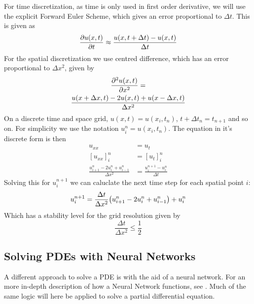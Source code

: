 For time discretization, as time is only used in first order derivative, we will use the explicit Forward Euler Scheme, which gives an error proportional to $\Delta t$. This is given as
\begin{equation}
    \pdv{u(x,t)}{t} \approx \frac{u(x,t+\Delta t) - u(x,t)}{\Delta t}
    \label{eq:FE}
\end{equation}
For the spatial discretization we use centred difference, which has an error proportional to $\Delta x^2$, given by
\begin{multline}
    \pdv[2]{u(x,t)}{x} = \\ \frac{u(x+\Delta x,t) - 2u(x,t) + u(x-\Delta x,t)}{\Delta x^2}
    \label{eq:CD}
\end{multline}
On a discrete time and space grid, $u(x,t) = u(x_i,t_n)$, $t+\Delta t_n = t_{n+1}$ and so on.
For simplicity we use the notation $u_i^n = u(x_i,t_n)$. The equation in it's discrete form is then
\begin{equation}
\begin{split}
    u_{xx} &= u_t \\
    [u_{xx}]_i^n &= [u_t]_i^n \\
    \frac{u_{i+1}^n - 2u_i^n + u_{i-1}^n}{\Delta x^2} &= \frac{u_i^{n+1}-u_i^n}{\Delta t}
\end{split}
\end{equation}
Solving this for $u_i^{n+1}$ we can caluclate the next time step for each spatial point $i$:
\begin{equation}
    u_i^{n+1} = \frac{\Delta t}{\Delta x^2}\qty(u_{i+1}^n - 2u_i^n + u_{i-1}^n)  + u_i^n
    \label{eq:theAlgorithm}
\end{equation}
Which has a stability level for the grid resolution given by
\begin{equation*}
    \frac{\Delta t}{\Delta x^2} \leq \frac{1}{2}
\end{equation*}

\subsection{Solving PDEs with Neural Networks}
A different approach to solve a PDE is with the aid of a neural network. For an more in-depth description of how a Neural Network functions, see \cite{prosjekt2}. Much of the same logic will here be applied to solve a partial differential equation.

